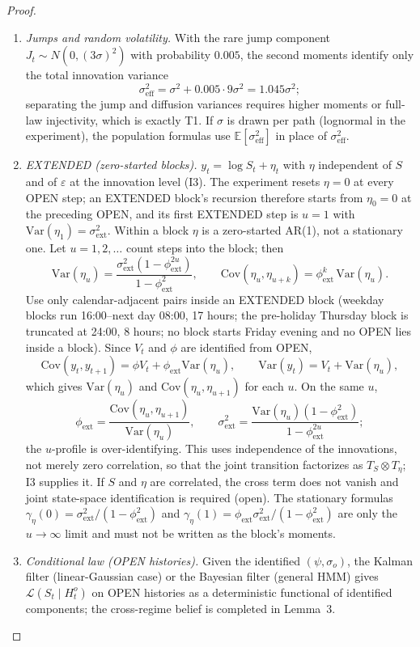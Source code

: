 \begin{proof}
\begin{enumerate}
\emph{Estimation caveat.}  Pooling variance levels across starts mixes the
$V_t$ profile, and the ratio $\phi$ is exact only when the $\Delta=1$ and
$\Delta=2$ pairs share the same start set; align by start time or include the
$(1-\phi^{2t})$ profile.
\item \emph{Jumps and random volatility.}  With the rare jump component
$J_t\sim N(0,(3\sigma)^2)$ with probability $0.005$, the second moments identify
only the total innovation variance
\[
\sigma_{\mathrm{eff}}^2=\sigma^2+0.005\cdot9\sigma^2=1.045\sigma^2;
\]
separating the jump and diffusion variances requires higher moments or full-law
injectivity, which is exactly T1.  If $\sigma$ is drawn per path (lognormal in
the experiment), the population formulas use
$\mathbb E[\sigma_{\mathrm{eff}}^2]$ in place of $\sigma_{\mathrm{eff}}^2$.
\item \emph{EXTENDED (zero-started blocks).}  $y_t=\log S_t+\eta_t$ with $\eta$
independent of $S$ and of $\varepsilon$ at the innovation level (I3).  The
experiment resets $\eta=0$ at every OPEN step; an EXTENDED block's recursion
therefore starts from $\eta_0=0$ at the preceding OPEN, and its first EXTENDED
step is $u=1$ with $\mathrm{Var}(\eta_1)=\sigma_{\mathrm{ext}}^2$.  Within a
block $\eta$ is a zero-started AR(1), not a stationary one.  Let $u=1,2,\dots$
count steps into the block; then
\[
\mathrm{Var}(\eta_u)
=\frac{\sigma_{\mathrm{ext}}^2(1-\phi_{\mathrm{ext}}^{2u})}
{1-\phi_{\mathrm{ext}}^2},
\qquad
\mathrm{Cov}(\eta_u,\eta_{u+k})
=\phi_{\mathrm{ext}}^k\,\mathrm{Var}(\eta_u).
\]
Use only calendar-adjacent pairs inside an EXTENDED block (weekday blocks run
16:00--next day 08:00, 17 hours; the pre-holiday Thursday block is truncated at
24:00, 8 hours; no block starts Friday evening and no OPEN lies inside a block).
Since $V_t$ and $\phi$ are identified from OPEN,
\[
\mathrm{Cov}(y_t,y_{t+1})=\phi V_t+\phi_{\mathrm{ext}}\mathrm{Var}(\eta_u),
\qquad
\mathrm{Var}(y_t)=V_t+\mathrm{Var}(\eta_u),
\]
which gives $\mathrm{Var}(\eta_u)$ and
$\mathrm{Cov}(\eta_u,\eta_{u+1})$ for each $u$.  On the same $u$,
\[
\phi_{\mathrm{ext}}
=\frac{\mathrm{Cov}(\eta_u,\eta_{u+1})}{\mathrm{Var}(\eta_u)},
\qquad
\sigma_{\mathrm{ext}}^2
=\frac{\mathrm{Var}(\eta_u)(1-\phi_{\mathrm{ext}}^2)}
{1-\phi_{\mathrm{ext}}^{2u}};
\]
the $u$-profile is over-identifying.  This uses independence of the innovations,
not merely zero correlation, so that the joint transition factorizes as
$T_S\otimes T_\eta$; I3 supplies it.  If $S$ and $\eta$ are correlated, the cross
term does not vanish and joint state-space identification is required (open).
The stationary formulas
$\gamma_\eta(0)=\sigma_{\mathrm{ext}}^2/(1-\phi_{\mathrm{ext}}^2)$ and
$\gamma_\eta(1)=\phi_{\mathrm{ext}}\sigma_{\mathrm{ext}}^2/
(1-\phi_{\mathrm{ext}}^2)$ are only the $u\to\infty$ limit and must not be
written as the block's moments.
\item \emph{Conditional law (OPEN histories).}  Given the identified
$(\psi,\sigma_o)$, the Kalman filter (linear-Gaussian case) or the Bayesian
filter (general HMM) gives $\mathcal L(S_t\mid H_t^o)$ on OPEN histories as a
deterministic functional of identified components; the cross-regime belief is
completed in Lemma~3.
\end{enumerate}


\end{proof}
